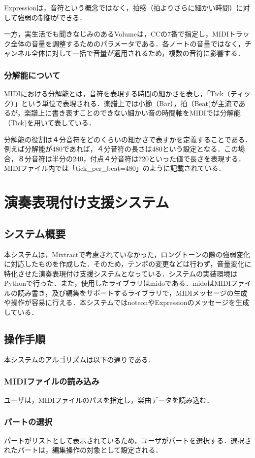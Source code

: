 Expressionは，音符という概念ではなく，拍感（拍よりさらに細かい時間）に対して強弱の制御ができる．

一方，実生活でも聞きなじみのあるVolumeは，CCの7番で指定し，MIDIトラック全体の音量を調整するためのパラメータである．各ノートの音量ではなく，チャンネル全体に対して一括で音量が適用されるため，複数の音符に影響する．
\subsubsection{分解能について}\label{sec:resolution}
MIDIにおける分解能とは，音符を表現する時間の細かさを表し，「Tick（ティック）」という単位で表現される．楽譜上では小節（Bar），拍（Beat)が主流であるが，楽譜上に書き表すことのできない細かい音の時間軸をMIDIでは分解能（Tick)を用いて表している．

分解能の役割は４分音符をどのくらいの細かさで表すかを定義することである．例えば分解能が480であれば，４分音符の長さは480という設定となる．この場合，８分音符は半分の240，付点４分音符は720といった値で長さを表現する．MIDIファイル内では「tick\_per\_beat=480」のように記載されている．

\section{演奏表現付け支援システム}
\subsection{システム概要}
本システムは，Mixtractで考慮されていなかった，ロングトーンの際の強弱変化に対応したものを作成した．そのため，テンポの変更などは行わず，音量変化に特化させた演奏表現付け支援システムとなっている．システムの実装環境はPythonで行った．また，使用したライブラリはmido\cite{mido}である．midoはMIDIファイルの読み書き，及び編集をサポートするライブラリで，MIDIメッセージの生成や操作が容易に行える．本システムではnoteonやExpressionのメッセージを生成している．
\subsection{操作手順}
本システムのアルゴリズムは以下の通りである．
\subsubsection{MIDIファイルの読み込み}
ユーザは，MIDIファイルのパスを指定し，楽曲データを読み込む．
\subsubsection{パートの選択}
パートがリストとして表示されているため，ユーザがパートを選択する．選択されたパートは，編集操作の対象として設定される．
